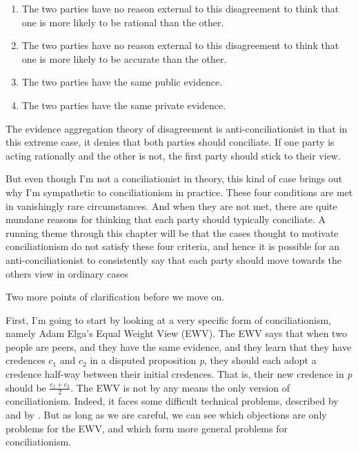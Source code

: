 \begin{enumerate}
\item{} The two parties have no reason external to this disagreement to think that one is more likely to be rational than the other.

\item{} The two parties have no reason external to this disagreement to think that one is more likely to be accurate than the other.

\item{} The two parties have the same public evidence.

\item{} The two parties have the same private evidence.

\end{enumerate}
The evidence aggregation theory of disagreement is anti-conciliationist in that in this extreme case, it denies that both parties should conciliate. If one party is acting rationally and the other is not, the first party should stick to their view.

But even though I'm not a conciliationist in theory, this kind of case brings out why I'm sympathetic to conciliationism in practice. These four conditions are met in vanishingly rare circumstances. And when they are not met, there are quite mundane reasons for thinking that each party should typically conciliate. A running theme through this chapter will be that the cases thought to motivate conciliationism do not satisfy these four criteria, and hence it is possible for an anti-conciliationist to consistently say that each party should move towards the others view in ordinary cases

Two more points of clarification before we move on.

First, I'm going to start by looking at a very specific form of conciliationism, namely Adam Elga's Equal Weight View (EWV). The EWV says that when two people are peers, and they have the same evidence, and they learn that they have credences $c_1$ and $c_2$ in a disputed proposition \emph{p}, they should each adopt a credence half-way between their initial credences. That is, their new credence in \emph{p} should be $\frac{c_1 + c_2}{2}$. The EWV is not by any means the only version of conciliationism. Indeed, it faces some difficult technical problems, described by \citet{JehleFitelson2009} and by \citet{Levinstein2013}. But as long as we are careful, we can see which objections are only problems for the EWV, and which form more general problems for conciliationism.

